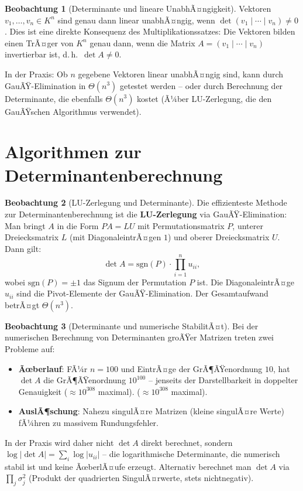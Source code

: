 ﻿\documentclass[a4paper,12pt]{report}
\theoremstyle{definition}
\newtheorem{beobachtung}{Beobachtung}
\begin{document}
\begin{beobachtung}[Determinante und lineare UnabhÃ¤ngigkeit]
    Vektoren $v_1, \ldots, v_n \in K^n$ sind genau dann linear unabhÃ¤ngig,
    wenn $\det(v_1 \mid \cdots \mid v_n) \neq 0$. Dies ist eine
    direkte Konsequenz des Multiplikationssatzes: Die Vektoren bilden
    einen TrÃ¤ger von $K^n$ genau dann, wenn die Matrix $A = (v_1 \mid \cdots \mid v_n)$
    invertierbar ist, d.\,h.\ $\det A \neq 0$.

    In der Praxis: Ob $n$ gegebene Vektoren linear unabhÃ¤ngig sind,
    kann durch GauÃŸ-Elimination in $\Theta(n^3)$ getestet werden --
    oder durch Berechnung der Determinante, die ebenfalls $\Theta(n^3)$
    kostet (Ã¼ber LU-Zerlegung, die den GauÃŸschen Algorithmus verwendet).
\end{beobachtung}


\section{Algorithmen zur Determinantenberechnung}

\begin{beobachtung}[LU-Zerlegung und Determinante]
    Die effizienteste Methode zur Determinantenberechnung ist die
    \textbf{LU-Zerlegung} via GauÃŸ-Elimination: Man bringt $A$
    in die Form $PA = LU$ mit Permutationsmatrix $P$, unterer
    Dreiecksmatrix $L$ (mit DiagonaleintrÃ¤gen $1$) und oberer
    Dreiecksmatrix $U$. Dann gilt:
    \[
        \det A = \mathrm{sgn}(P) \cdot \prod_{i=1}^n u_{ii},
    \]
    wobei $\mathrm{sgn}(P) = \pm 1$ das Signum der Permutation $P$ ist.
    Die DiagonaleintrÃ¤ge $u_{ii}$ sind die Pivot-Elemente der
    GauÃŸ-Elimination. Der Gesamtaufwand betrÃ¤gt $\Theta(n^3)$.
\end{beobachtung}

\begin{beobachtung}[Determinante und numerische StabilitÃ¤t]
    Bei der numerischen Berechnung von Determinanten groÃŸer Matrizen
    treten zwei Probleme auf:
    \begin{itemize}
        \item[-] \textbf{Ãœber\-lauf}: FÃ¼r $n = 100$ und EintrÃ¤ge der
              GrÃ¶ÃŸen\-ordnung $10$, hat $\det A$ die GrÃ¶ÃŸen\-ordnung $10^{100}$
              -- jenseits der Darstellbarkeit
              in doppelter Genauigkeit ($\approx 10^{308}$ maximal).
              ($\approx 10^{308}$ maximal).
        \item[-] \textbf{AuslÃ¶schung}: Nahezu singulÃ¤re Matrizen
              (kleine singulÃ¤re Werte) fÃ¼hren zu massivem Rundungsfehler.
    \end{itemize}
    In der Praxis wird daher nicht $\det A$ direkt berechnet, sondern
    $\log|\det A| = \sum_i \log|u_{ii}|$ -- die logarithmische
    Determinante, die numerisch stabil ist und keine ÃœberlÃ¤ufe erzeugt.
    Alternativ berechnet man $\det A$ via $\prod_j \sigma_j^2$
    (Produkt der quadrierten SingulÃ¤rwerte, stets nichtnegativ).
\end{beobachtung}
\end{document}
